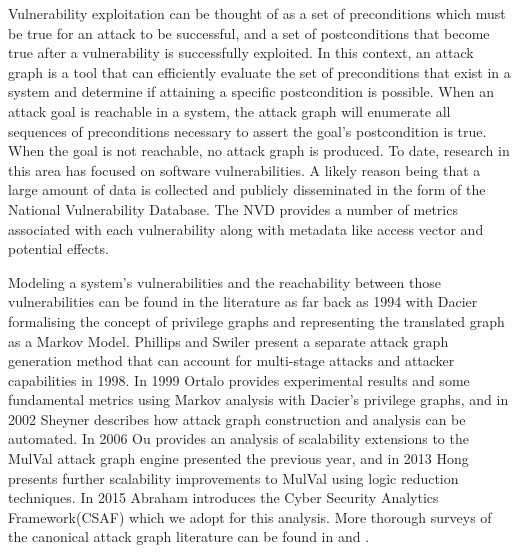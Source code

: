 
Vulnerability exploitation can be thought of as a set of preconditions which must be true for an attack to be successful, and a set of postconditions that become true after a vulnerability is successfully exploited. In this context, an attack graph is a tool that can efficiently evaluate the set of preconditions that exist in a system and determine if attaining a specific postcondition is possible. When an attack goal is reachable in a system, the attack graph will enumerate all sequences of preconditions necessary to assert the goal’s postcondition is true. When the goal is not reachable, no attack graph is produced. To date, research in this area has focused on software vulnerabilities. A likely reason being that a large amount of data is collected and publicly disseminated in the form of the National Vulnerability Database. The NVD provides a number of metrics associated with each vulnerability along with metadata like access vector and potential effects. 

Modeling a system's vulnerabilities and the reachability between those vulnerabilities can be found in the literature as far back as 1994 with Dacier\cite{Dacier_1994} formalising the concept of privilege graphs and representing the translated graph as a Markov Model. Phillips and Swiler\cite{Phillips_Swiler_1998} present a separate attack graph generation method that can account for multi-stage attacks and attacker capabilities in 1998. In 1999 Ortalo\cite{Ortalo_1999}  provides experimental results and some fundamental metrics using Markov analysis with Dacier's privilege graphs, and in 2002 Sheyner\cite{Sheyner_Haines_Jha_Lippmann_Wing_2002} describes how attack graph construction and analysis can be automated. In 2006 Ou\cite{Ou_Boyer_McQueen_2006} provides an analysis of scalability extensions to the MulVal\cite{Ou_Govindavajhala_Appel} attack graph engine presented the previous year, and in 2013 Hong\cite{Hong_Kim_Takaoka_2013} presents further scalability improvements to MulVal using logic reduction techniques. In 2015 Abraham\cite{Abraham_Nair_2015b} introduces the Cyber Security Analytics Framework(CSAF) which we adopt for this analysis. More thorough surveys of the canonical attack graph literature can be found in \cite{Kordy_2013} and \cite{Lippmann_Ingols_2005}. %

